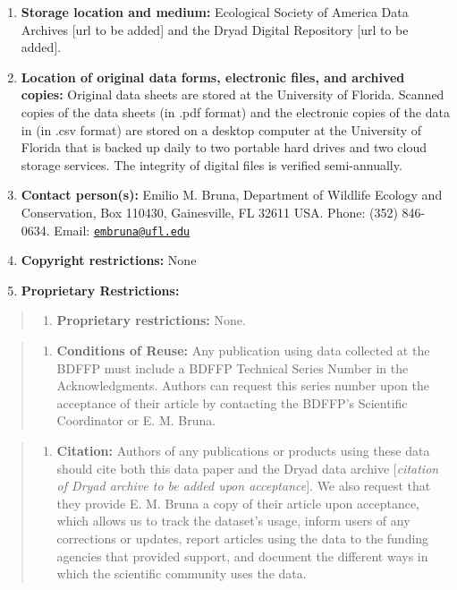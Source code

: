 \documentclass[
  12pt,
  man, donotrepeattitle]{apa6}
\providecommand{\tightlist}{%
  \setlength{\itemsep}{0pt}\setlength{\parskip}{0pt}}
\begin{document}
\begin{enumerate}
\def\labelenumi{\arabic{enumi}.}
\item
  \textbf{Storage location and medium:} Ecological Society of America Data Archives {[}url to be added{]} and the Dryad Digital Repository {[}url to be added{]}.
\item
  \textbf{Location of original data forms, electronic files, and archived copies:} Original data sheets are stored at the University of Florida. Scanned copies of the data sheets (in .pdf format) and the electronic copies of the data in (in .csv format) are stored on a desktop computer at the University of Florida that is backed up daily to two portable hard drives and two cloud storage services. The integrity of digital files is verified semi-annually.
\item
  \textbf{Contact person(s):} Emilio M. Bruna, Department of Wildlife Ecology and Conservation, Box 110430, Gainesville, FL 32611 USA. Phone: (352) 846-0634. Email: \href{mailto:embruna@ufl.edu}{\nolinkurl{embruna@ufl.edu}}
\item
  \textbf{Copyright restrictions:} None
\item
  \textbf{Proprietary Restrictions:}
\end{enumerate}

\begin{quote}
\begin{enumerate}
\def\labelenumi{\alph{enumi}.}
\tightlist
\item
  \textbf{Proprietary restrictions:} None.
\end{enumerate}
\end{quote}

\begin{quote}
\begin{enumerate}
\def\labelenumi{\alph{enumi}.}
\setcounter{enumi}{1}
\tightlist
\item
  \textbf{Conditions of Reuse:} Any publication using data collected at the BDFFP must include a BDFFP Technical Series Number in the Acknowledgments. Authors can request this series number upon the acceptance of their article by contacting the BDFFP's Scientific Coordinator or E. M. Bruna.
\end{enumerate}
\end{quote}

\begin{quote}
\begin{enumerate}
\def\labelenumi{\alph{enumi}.}
\setcounter{enumi}{2}
\tightlist
\item
  \textbf{Citation:} Authors of any publications or products using these data should cite both this data paper and the Dryad data archive {[}\emph{citation of Dryad archive to be added upon acceptance}{]}. We also request that they provide E. M. Bruna a copy of their article upon acceptance, which allows us to track the dataset's usage, inform users of any corrections or updates, report articles using the data to the funding agencies that provided support, and document the different ways in which the scientific community uses the data.
\end{enumerate}
\end{quote}
\end{document}
